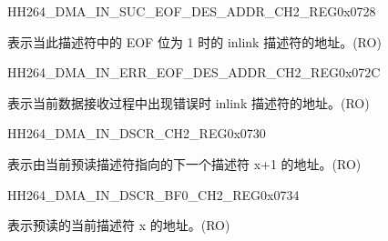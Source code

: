     
    \begin{register}{H}{H264\_DMA\_IN\_SUC\_EOF\_DES\_ADDR\_CH2\_REG}{0x0728}\label{regdesc:H264DMAINSUCEOFDESADDRCH2REG}
    \regnewline%
    \begin{regdesc}\begin{reglist}
    \label{fielddesc:H264DMAINSUCEOFDESADDRCH2}\item [H264\_DMA\_IN\_SUC\_EOF\_DES\_ADDR\_CH2] 表示当此描述符中的 EOF 位为 1 时的 inlink 描述符的地址。(RO)
    \end{reglist}\end{regdesc}
    \end{register}
    
    
    \begin{register}{H}{H264\_DMA\_IN\_ERR\_EOF\_DES\_ADDR\_CH2\_REG}{0x072C}\label{regdesc:H264DMAINERREOFDESADDRCH2REG}
    \regnewline%
    \begin{regdesc}\begin{reglist}
    \label{fielddesc:H264DMAINERREOFDESADDRCH2}\item [H264\_DMA\_IN\_ERR\_EOF\_DES\_ADDR\_CH2] 表示当前数据接收过程中出现错误时 inlink 描述符的地址。(RO)
    \end{reglist}\end{regdesc}
    \end{register}
    
    
    \begin{register}{H}{H264\_DMA\_IN\_DSCR\_CH2\_REG}{0x0730}\label{regdesc:H264DMAINDSCRCH2REG}
    \regnewline%
    \begin{regdesc}\begin{reglist}
    \label{fielddesc:H264DMAINLINKDSCRCH2}\item [H264\_DMA\_INLINK\_DSCR\_CH2] 表示由当前预读描述符指向的下一个描述符 x+1 的地址。(RO)
    \end{reglist}\end{regdesc}
    \end{register}
    
    
    \begin{register}{H}{H264\_DMA\_IN\_DSCR\_BF0\_CH2\_REG}{0x0734}\label{regdesc:H264DMAINDSCRBF0CH2REG}
    \regnewline%
    \begin{regdesc}\begin{reglist}
    \label{fielddesc:H264DMAINLINKDSCRBF0CH2}\item [H264\_DMA\_INLINK\_DSCR\_BF0\_CH2] 表示预读的当前描述符 x 的地址。(RO)
    \end{reglist}\end{regdesc}
    \end{register}
    
